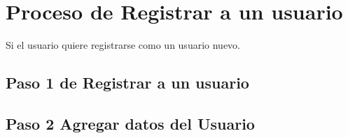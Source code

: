 \chapter{Proceso de Registrar a un usuario}
	Si el usuario  quiere registrarse como un usuario nuevo.	
	 
	
\section{Paso 1 de Registrar a un usuario}
	

\section{Paso 2 Agregar datos del Usuario}
	



